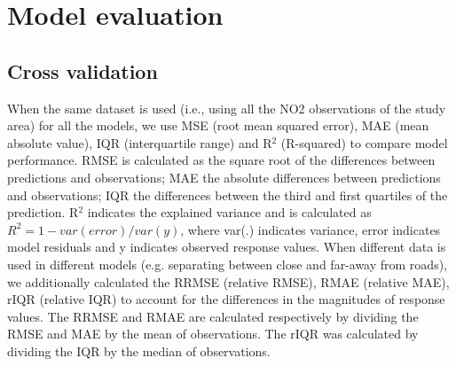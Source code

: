 \documentclass{article}
\begin{document}
\section{Model evaluation}

\subsection{Cross validation}
When the same dataset is used (i.e., using all the NO2 observations of the study area) for all the models, we use MSE (root mean squared error), MAE (mean absolute value), IQR (interquartile range) and R$^2$ (R-squared) to compare model performance.   
RMSE is calculated as the square root of the differences between predictions and observations; MAE the absolute differences between predictions and observations; IQR the differences between the third and first quartiles of the prediction. R$^2$ indicates the explained variance and is calculated as $R^2 = 1- var(error) / var(y)$, where var(.) indicates variance, error indicates model residuals and y indicates observed response values. When different data is used in different models (e.g. separating between close and far-away from roads), we additionally calculated the RRMSE (relative RMSE), RMAE (relative MAE), rIQR (relative IQR) to account for the differences in the magnitudes of response values. The RRMSE and RMAE are calculated respectively by dividing the RMSE and MAE by the mean of observations. The rIQR was calculated by dividing the IQR by the median of observations.  
\end{document}
